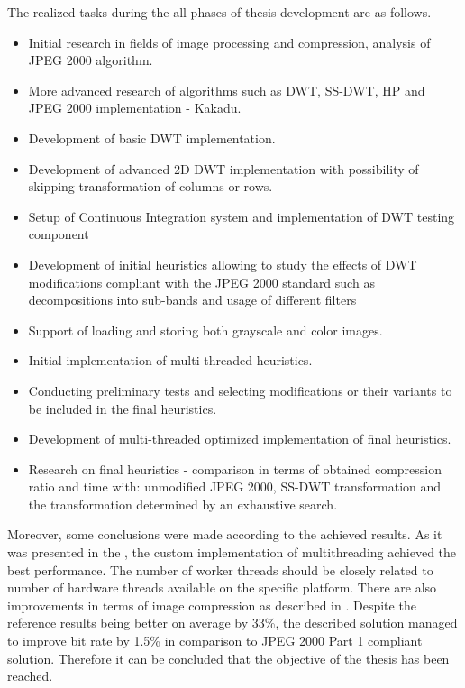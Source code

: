 The realized tasks during the all phases of thesis development are as follows.
\begin{itemize}
    \item Initial research in fields of image processing and compression, analysis of JPEG 2000 algorithm. 
    \item More advanced research of algorithms such as DWT, SS-DWT, HP and JPEG 2000 implementation - Kakadu.
    \item Development of basic DWT implementation.
    \item Development of advanced 2D DWT implementation with possibility of skipping transformation of columns or rows.
    \item Setup of Continuous Integration system and implementation of DWT testing component 
    \item Development of initial heuristics allowing to study the effects of DWT modifications compliant
    with the JPEG 2000 standard such as decompositions into sub-bands and usage of different filters
    \item Support of loading and storing both grayscale and color images.
    \item Initial implementation of multi-threaded heuristics.
    \item Conducting preliminary tests and selecting modifications or their variants to be included in the final heuristics.
    \item Development of multi-threaded optimized implementation of final heuristics.
    \item Research on final heuristics - comparison in terms of obtained compression ratio and time with: unmodified JPEG 2000,
    SS-DWT transformation and the transformation determined by an exhaustive search.
\end{itemize}

Moreover, some conclusions were made according to the achieved results. As it was presented
in the , the custom implementation of multithreading achieved
the best performance. The number of worker threads should be closely related to number of
hardware threads available on the specific platform. There are also improvements in terms of
image compression as described in . Despite the reference results
being better on average by 33\%, the described solution managed to improve bit rate by 1.5\% in
comparison to JPEG 2000 Part 1 compliant solution. Therefore it can be concluded that the objective
of the thesis has been reached.

